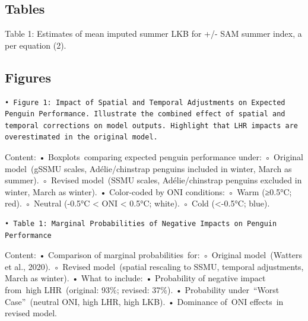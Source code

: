 \documentclass[]{elsarticle} %
\begin{document}
\begin{frontmatter}

  \title{}
    \author[1]{Andrew Lowther%
  }
  
    \author[2]{Ulf Lindstrøm%
  }
  
    \author[3]{Bjørn Krafft%
  }
  
    \author[4]{Javier A. Arata%
  }
  
  
  \begin{abstract}
  
  \end{abstract}
  
 \end{frontmatter}

\subsection{Tables}\label{tables}

Table 1: Estimates of mean imputed summer LKB for +/- SAM summer index,
a per equation (2).

\subsection{Figures}\label{figures}

\begin{verbatim}
• Figure 1: Impact of Spatial and Temporal Adjustments on Expected Penguin Performance. Illustrate the combined effect of spatial and temporal corrections on model outputs. Highlight that LHR impacts are overestimated in the original model.
\end{verbatim}

Content: • Boxplots~comparing expected penguin performance under: ◦
Original model~(gSSMU scales, Adélie/chinstrap penguins included in
winter, March as summer). ◦ Revised model~(SSMU scales, Adélie/chinstrap
penguins excluded in winter, March as winter). • Color-coded by ONI
conditions: ◦ Warm (≥0.5°C; red). ◦ Neutral (-0.5°C \textless{} ONI
\textless{} 0.5°C; white). ◦ Cold (\textless-0.5°C; blue).

\begin{verbatim}
• Table 1: Marginal Probabilities of Negative Impacts on Penguin Performance
\end{verbatim}

Content: • Comparison of marginal probabilities~for: ◦ Original
model~(Watters et al., 2020). ◦ Revised model~(spatial rescaling to
SSMU, temporal adjustments, March as winter). • What to include: •
Probability of negative impact from~high LHR~(original: 93\%; revised:
37\%). • Probability under~``Worst Case''~(neutral ONI, high LHR, high
LKB). • Dominance of~ONI effects~in revised model.
\end{document}
